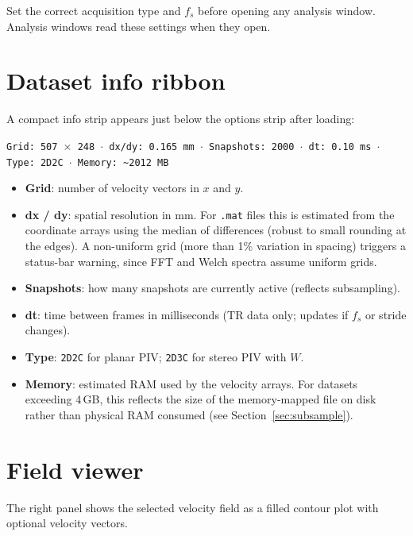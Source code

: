 \documentclass[11pt, a4paper]{report}
\begin{document}
\begin{warnbox}
Set the correct acquisition type and $f_s$ before opening any analysis window. Analysis windows read these settings when they open.
\end{warnbox}

\section{Dataset info ribbon}
\label{sec:datasetinfo}

A compact info strip appears just below the options strip after loading:

\begin{center}
\texttt{Grid: 507\,$\times$\,248 $\cdot$ dx/dy: 0.165\,mm $\cdot$ Snapshots: 2000 $\cdot$ dt: 0.10\,ms $\cdot$ Type: 2D2C $\cdot$ Memory: \textasciitilde{}2012\,MB}
\end{center}

\begin{itemize}[leftmargin=1.5em]
  \item \textbf{Grid}: number of velocity vectors in $x$ and $y$.
  \item \textbf{dx / dy}: spatial resolution in mm. For \texttt{.mat} files this is estimated from the coordinate arrays using the median of differences (robust to small rounding at the edges). A non-uniform grid (more than 1\% variation in spacing) triggers a status-bar warning, since FFT and Welch spectra assume uniform grids.
  \item \textbf{Snapshots}: how many snapshots are currently active (reflects subsampling).
  \item \textbf{dt}: time between frames in milliseconds (TR data only; updates if $f_s$ or stride changes).
  \item \textbf{Type}: \texttt{2D2C} for planar PIV; \texttt{2D3C} for stereo PIV with $W$.
  \item \textbf{Memory}: estimated RAM used by the velocity arrays. For datasets exceeding 4\,GB, this reflects the size of the memory-mapped file on disk rather than physical RAM consumed (see Section~\ref{sec:subsample}).
\end{itemize}

\section{Field viewer}

The right panel shows the selected velocity field as a filled contour plot with optional velocity vectors.
\end{document}

